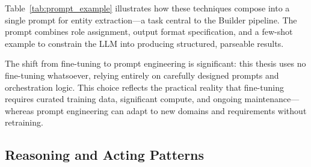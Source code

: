 Table~\ref{tab:prompt_example} illustrates how these techniques compose into a single prompt for entity extraction---a task central to the Builder pipeline. The prompt combines role assignment, output format specification, and a few-shot example to constrain the LLM into producing structured, parseable results.

\begin{table}[htbp]
\centering
\caption{Composed prompt example for entity extraction, combining role, few-shot, and output format techniques.}
\label{tab:prompt_example}
\end{table}

The shift from fine-tuning to prompt engineering is significant: this thesis uses no fine-tuning whatsoever, relying entirely on carefully designed prompts and orchestration logic. This choice reflects the practical reality that fine-tuning requires curated training data, significant compute, and ongoing maintenance---whereas prompt engineering can adapt to new domains and requirements without retraining.

\subsection{Reasoning and Acting Patterns}
\label{sec:rw:reasoning_patterns}

